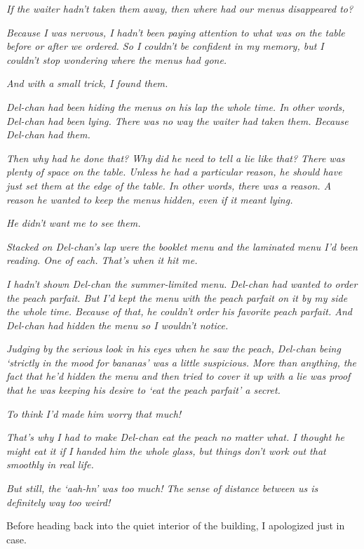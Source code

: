 \documentclass[
    a4paper,
    12pt,
    twoside,
    openany,
    UTF8,
    fontset=windows
]{ctexbook}
\begin{document}
\textit{If the waiter hadn't taken them away, then where had our menus disappeared to?}

\textit{Because I was nervous, I hadn't been paying attention to what was on the table before or after we ordered. So I couldn't be confident in my memory, but I couldn't stop wondering where the menus had gone.}

\textit{And with a small trick, I found them.}

\textit{Del-chan had been hiding the menus on his lap the whole time. In other words, Del-chan had been lying. There was no way the waiter had taken them. Because Del-chan had them.}

\textit{Then why had he done that? Why did he need to tell a lie like that? There was plenty of space on the table. Unless he had a particular reason, he should have just set them at the edge of the table. In other words, there was a reason. A reason he wanted to keep the menus hidden, even if it meant lying.}

\textit{He didn't want me to see them.}

\textit{Stacked on Del-chan's lap were the booklet menu and the laminated menu I'd been reading. One of each. That's when it hit me.}

\textit{I hadn't shown Del-chan the summer-limited menu. Del-chan had wanted to order the peach parfait. But I'd kept the menu with the peach parfait on it by my side the whole time. Because of that, he couldn't order his favorite peach parfait. And Del-chan had hidden the menu so I wouldn't notice.}

\textit{Judging by the serious look in his eyes when he saw the peach, Del-chan being `strictly in the mood for bananas' was a little suspicious. More than anything, the fact that he'd hidden the menu and then tried to cover it up with a lie was proof that he was keeping his desire to `eat the peach parfait' a secret.}

\textit{To think I'd made him worry that much!}

\textit{That's why I had to make Del-chan eat the peach no matter what. I thought he might eat it if I handed him the whole glass, but things don't work out that smoothly in real life.}

\textit{But still, the `aah-hn' was too much! The sense of distance between us is definitely way too weird!}

Before heading back into the quiet interior of the building, I apologized just in case.
\end{document}
